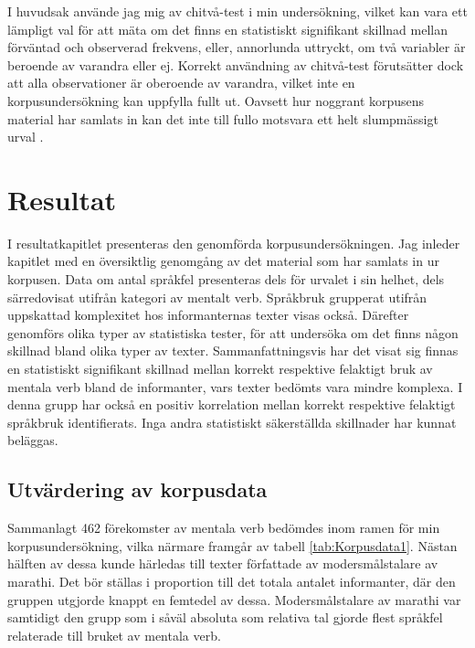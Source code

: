 \documentclass[12pt,a4paper]{article}
\begin{document}
\noindent
I huvudsak använde jag mig av chitvå-test i min undersökning, vilket kan vara ett lämpligt val för att mäta om det finns en statistiskt signifikant skillnad mellan förväntad och observerad frekvens, eller, annorlunda uttryckt, om två variabler är beroende av varandra eller ej. Korrekt användning av chitvå-test förutsätter dock att alla observationer är oberoende av varandra, vilket inte en korpusundersökning kan uppfylla fullt ut. Oavsett hur noggrant korpusens material har samlats in kan det inte till fullo motsvara ett helt slumpmässigt urval \autocite{brezina2018,körner2015}.




\newpage
\section{Resultat}
\label{ch:Resultat}
I resultatkapitlet presenteras den genomförda korpusundersökningen. Jag inleder kapitlet med en översiktlig genomgång av det material som har samlats in ur korpusen. Data om antal språkfel presenteras dels för urvalet i sin helhet, dels särredovisat utifrån kategori av mentalt verb. Språkbruk grupperat utifrån uppskattad komplexitet hos informanternas texter visas också. Därefter genomförs olika typer av statistiska tester, för att undersöka om det finns någon skillnad bland olika typer av texter. Sammanfattningsvis har det visat sig finnas en statistiskt signifikant skillnad mellan korrekt respektive felaktigt bruk av mentala verb bland de informanter, vars texter bedömts vara mindre komplexa. I denna grupp har också en positiv korrelation mellan korrekt respektive felaktigt språkbruk identifierats. Inga andra statistiskt säkerställda skillnader har kunnat beläggas.

\subsection{Utvärdering av korpusdata}
\label{sec:Resultat: Utvärdering av korpusdata}
Sammanlagt 462 förekomster av mentala verb bedömdes inom ramen för min korpusundersökning, vilka närmare framgår av tabell \ref{tab:Korpusdata1}. Nästan hälften av dessa kunde härledas till texter författade av modersmålstalare av marathi. Det bör ställas i proportion till det totala antalet informanter, där den gruppen utgjorde knappt en femtedel av dessa. Modersmålstalare av marathi var samtidigt den grupp som i såväl absoluta som relativa tal gjorde flest språkfel relaterade till bruket av mentala verb.
\end{document}
